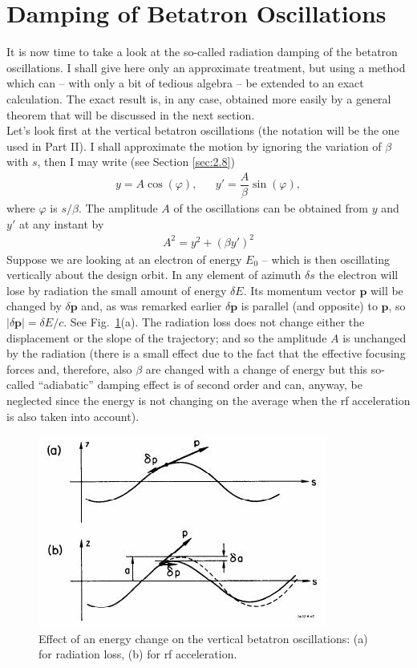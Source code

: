\section{Damping of Betatron Oscillations}\label{sec:4.3}
It is now time to take a look at the so-called radiation damping of the betatron oscillations. I shall give here only an approximate treatment, but using a method which can -- with only a bit of tedious algebra -- be extended to an exact calculation. The exact result is, in any case, obtained more easily by a general theorem that will be discussed in the next section.\\
Let's look first at the vertical betatron oscillations (the notation will be the one used in Part II). I shall approximate the motion by ignoring the variation of $\beta$ with $s$, then I may write (see Section \ref{sec:2.8})
\begin{align}
	y = A \cos(\varphi), && y' = \dfrac{A}{\beta}\sin(\varphi),
\end{align}
where $\varphi$ is $s/\beta$. The amplitude $A$ of the oscillations can be obtained from $y$ and
$y'$ at any instant by
\begin{align}
	A^2 = y^2 + (\beta y')^2
\end{align}
Suppose we are looking at an electron of energy $E_0$ -- which is then oscillating vertically
 about the design orbit. In any element of azimuth $\delta s$ the electron will lose by radiation
 the small amount of energy $\delta E$. Its momentum vector $\bm{p}$ will be changed by $\delta \bm{p}$ and, as was remarked earlier $\delta \bm{p}$ is parallel (and opposite) to $\bm{p}$, so $|\delta \bm{p}| = \delta E/c$. See Fig.~\ref{fig:fig40}(a). The radiation loss does not change either the displacement or the slope of the trajectory; and so the amplitude $A$ is unchanged
by the radiation (there is a small effect due to the fact that the effective focusing forces and, therefore, also $\beta$ are changed with a change of energy but this so-called ``adiabatic'' damping effect is of second order and can, anyway, be neglected since the energy is not changing on the average when the rf acceleration is also taken into account).

\begin{figure}[!htb]
	\centering
	\includegraphics[width=0.8\linewidth]{./Figuras/fig40.jpeg}
	\caption{Effect of an energy change on the vertical betatron oscillations: (a) for radiation loss, (b) for rf acceleration.}
	\label{fig:fig40}
\end{figure}

